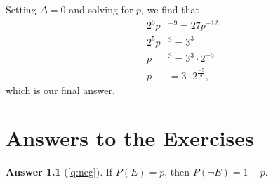\documentclass{book}
\theoremstyle{definition}
\newtheorem*{exercise*}{Answer}
\theoremstyle{colonstylebf}
\begin{document}
Setting $\Delta = 0$ and solving for $p$, we find that
\begin{align*}
2^5p&^{-9} = 27p^{-12}\\
2^5p&^3 = 3^3\\
p&^3 = 3^3\cdot 2^{-5}\\
p& = 3\cdot 2^{\frac{-5}{3}},
\end{align*}
which is our final answer.









\appendix
\chapter{Answers to the Exercises}\label{answers}
\begin{exercise*}[\ref{q:neg}]
If $P(E) = p$, then $P(\neg E) = 1 - p$.
\end{exercise*}
\end{document}
